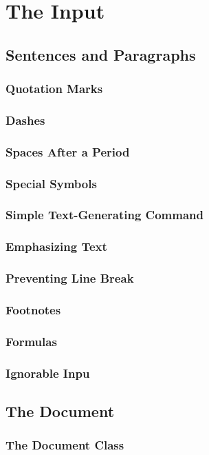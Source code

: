 \section{The Input}
\subsection{Sentences and Paragraphs}
\subsubsection{Quotation Marks}
\subsubsection{Dashes}
\subsubsection{Spaces After a Period}
\subsubsection{Special Symbols}
\subsubsection{Simple Text-Generating Command}
\subsubsection{Emphasizing Text}
\subsubsection{Preventing Line Break}
\subsubsection{Footnotes}
\subsubsection{Formulas}
\subsubsection{Ignorable Inpu}


\subsection{The Document}
\subsubsection{The Document Class}
